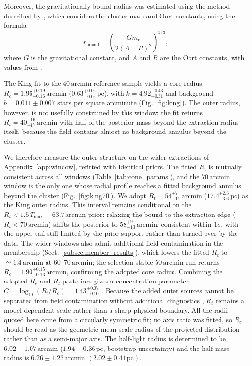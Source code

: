 \documentclass{aa}
\begin{document}
Moreover, the gravitationally bound radius was estimated using the method described by \citet{1998MNRAS.299..955P}, which considers the cluster mass and Oort constants, using the formula
\begin{equation}
	r_\mathrm{bound} = \left( \frac{Gm_{\mathrm{c}}}{2(A-B)^2} \right)^{1/3},
\end{equation}
where $G$ is the gravitational constant, and $A$ and $B$ are the Oort constants, with values from \citet{2017MNRAS.468L..63B}.

The King fit to the $40\,\mathrm{arcmin}$ reference sample yields a core radius $R_c = 1.96^{+0.19}_{-0.16}\,\mathrm{arcmin}$ ($0.63^{+0.06}_{-0.05}\,\mathrm{pc}$), with $k = 4.92^{+0.43}_{-0.31}$ and background $b = 0.011\pm0.007$ stars per square arcminute (Fig.~\ref{fig:king}). The outer radius, however, is not usefully constrained by this window: the fit returns $R_t = 40^{+16}_{-17}\,\mathrm{arcmin}$ with half of the posterior mass beyond the extraction radius itself, because the field contains almost no background annulus beyond the cluster.

We therefore measure the outer structure on the wider extractions of Appendix~\ref{app:window}, refitted with identical priors. The fitted $R_t$ is mutually consistent across all windows (Table~\ref{tab:cone_params}), and the $70\,\mathrm{arcmin}$ window is the only one whose radial profile reaches a fitted background annulus beyond the cluster (Fig.~\ref{fig:king70}). We adopt $R_t = 54^{+7}_{-11}\,\mathrm{arcmin}$ ($17.4^{+2.3}_{-3.6}\,\mathrm{pc}$) as the King outer radius. This interval remains conditional on the $R_t<1.5\,T_{\mathrm{max}}=63.7\,\mathrm{arcmin}$ prior: relaxing the bound to the extraction edge ($R_t<70\,\mathrm{arcmin}$) shifts the posterior to $58^{+9}_{-13}\,\mathrm{arcmin}$, consistent within $1\sigma$, with the upper tail still limited by the prior support rather than turned over by the data. The wider windows also admit additional field contamination in the membership (Sect.~\ref{subsec:member_results}), which lowers the fitted $R_c$ to $\simeq1.4\,\mathrm{arcmin}$ at $60$--$70\,\mathrm{arcmin}$; the selection-stable $50\,\mathrm{arcmin}$ run returns $R_c = 1.90^{+0.15}_{-0.13}\,\mathrm{arcmin}$, confirming the adopted core radius. Combining the adopted $R_c$ and $R_t$ posteriors gives a concentration parameter $C = \log_{10}(R_t/R_c) = 1.43^{+0.07}_{-0.10}$ \citep{1975AJ.....80..427P}. Because the added outer sources cannot be separated from field contamination without additional diagnostics \citep{2025A&A...694A.258R,2025A&A...698A.156X}, $R_t$ remains a model-dependent scale rather than a sharp physical boundary. All the radii quoted here come from a circularly symmetric fit; no axis ratio was fitted, so $R_c$ should be read as the geometric-mean scale radius of the projected distribution rather than as a semi-major axis. The half-light radius is determined to be $6.02 \pm 1.07\,\mathrm{arcmin}$ ($1.94 \pm 0.36\,\mathrm{pc}$, bootstrap uncertainty) and the half-mass radius is $6.26 \pm 1.23\,\mathrm{arcmin}$ $(2.02 \pm 0.41\,\mathrm{pc})$.
\end{document}
